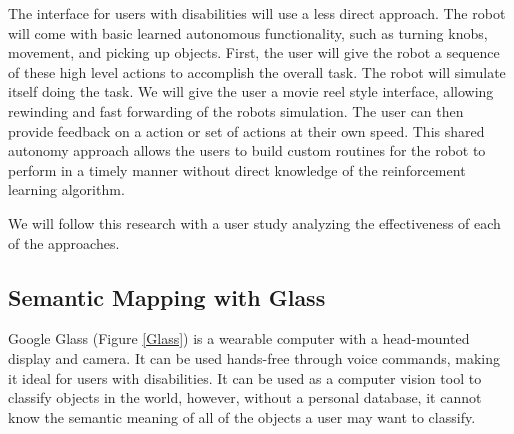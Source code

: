 \documentclass{article}
\begin{document}
The interface for users with disabilities will use a less direct approach. The robot will come with basic learned autonomous functionality, such as turning knobs, movement, and picking up objects. First, the user will give the robot a sequence of these high level actions to accomplish the overall task. The robot will simulate itself doing the task. We will give the user a movie reel style interface, allowing rewinding and fast forwarding of the robots simulation. The user can then provide feedback on a action or set of actions at their own speed. This shared autonomy approach allows the users to build custom routines for the robot to perform in a timely manner without direct knowledge of the reinforcement learning algorithm.

We will follow this research with a user study analyzing the effectiveness of each of the approaches. 

\subsection{Semantic Mapping with Glass}

Google Glass (Figure \ref{Glass}) is a wearable computer with a head-mounted display and camera. It can be used hands-free through voice commands, making it ideal for users with disabilities. It can be used as a computer vision tool to classify objects in the world, however, without a personal database, it cannot know the semantic meaning of all of the objects a user may want to classify. 
\end{document}
